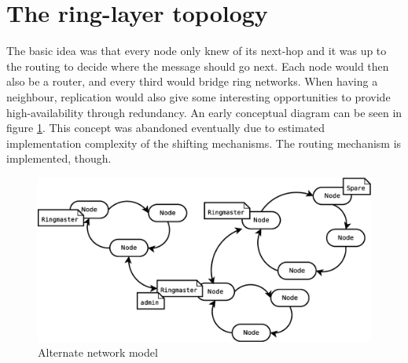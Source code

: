 \documentclass[10pt,a4paper]{article}
\begin{document}
\newpage
\appendix

\section{The ring-layer topology}
\label{sec:ring_layer_topology}
The basic idea was that every node only knew of its next-hop and it was up to the routing to decide where the message should go next. Each node would then also be a router, and every third would bridge ring networks. When having a neighbour, replication would also give some interesting opportunities to provide high-availability through redundancy. An early conceptual diagram can be seen in figure \ref{fig:old_network_model}.
This concept was abandoned eventually due to estimated implementation complexity of the shifting mechanisms. The routing mechanism is implemented, though.

\begin{figure}[h]
\centering
\includegraphics[scale=0.3]{fig/old_topology.eps}
 \caption{Alternate network model}
 \label{fig:old_network_model}
\end{figure}
\end{document}
